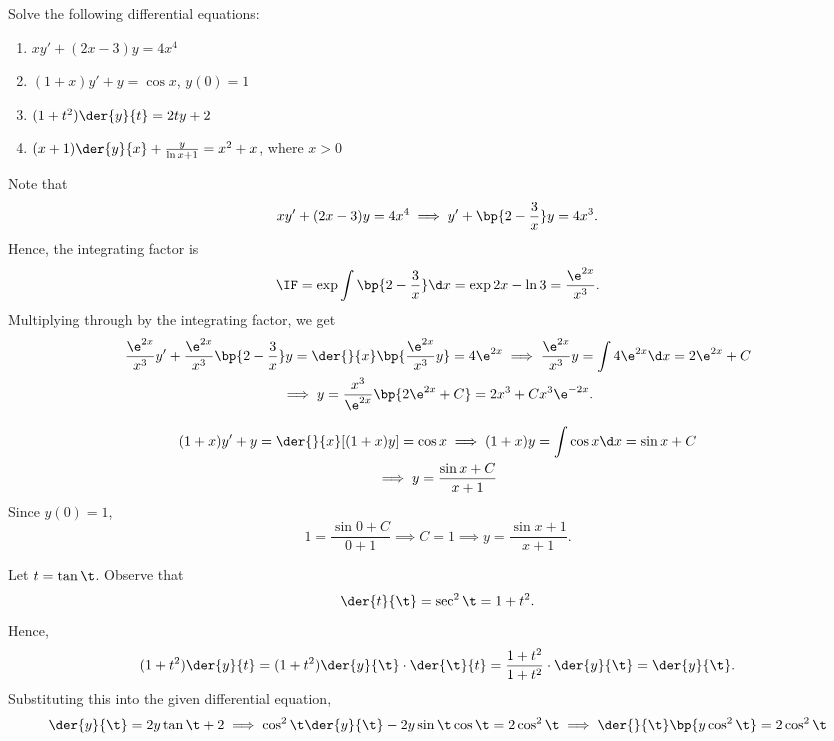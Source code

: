 \begin{problem}
    Solve the following differential equations:
    \begin{enumerate}
        \item $xy' + (2x-3)y = 4x^4$
        \item $(1+x)y' + y = \cos x$, $y(0) = 1$
        \item $(1 + t^2) \der{y}{t} = 2ty+2$
        \item $(x+1)\der{y}{x} + \frac{y}{\ln{x+1}} = x^2 + x$, where $x > 0$
    \end{enumerate}
\end{problem}
\clearpage
\begin{solution}
    \begin{ppart}
        Note that \[xy' + (2x-3)y = 4x^4 \implies y' + \bp{2 - \frac3x} y = 4x^3.\] Hence, the integrating factor is \[\IF = \exp \int \bp{2 - \frac3x} \d x = \exp{2x - \ln 3} = \frac{\e^{2x}}{x^3}.\] Multiplying through by the integrating factor, we get
        \begin{gather*}
            \frac{\e^{2x}}{x^3}y' + \frac{\e^{2x}}{x^3} \bp{2 - \frac3x} y = \der{}{x} \bp{\frac{\e^{2x}}{x^3} y} = 4\e^{2x} \implies \frac{\e^{2x}}{x^3} y = \int 4\e^{2x} \d x = 2\e^{2x} + C\\
            \implies y = \frac{x^3}{\e^{2x}} \bp{2\e^{2x} + C} = 2x^3 + Cx^3\e^{-2x}.
        \end{gather*}
    \end{ppart}
    \begin{ppart}
        \begin{gather*}
            (1+x)y' + y = \der{}{x} [(1+x)y] = \cos x \implies (1+x)y = \int \cos x \d x = \sin x + C\\
            \implies y = \frac{\sin x + C}{x+1}
        \end{gather*}
        Since $y(0) = 1$, \[1 = \frac{\sin 0 + C}{0+1} \implies C = 1 \implies y = \frac{\sin x + 1}{x + 1}.\]
    \end{ppart}
    \begin{ppart}
        Let $t = \tan \t$. Observe that \[\der{t}{\t} = \sec^2 \t = 1 + t^2.\] Hence, \[(1 + t^2) \der{y}{t} = (1 + t^2) \der{y}{\t} \cdot \der{\t}{t} = \frac{1 + t^2}{1 + t^2} \cdot \der{y}{\t} = \der{y}{\t}.\] Substituting this into the given differential equation,
        \begin{gather*}
            \der{y}{\t} = 2 y \tan \t + 2 \implies \cos^2 \t \der{y}{\t} - 2 y \sin \t \cos \t = 2\cos^2 \t \implies \der{}{\t} \bp{y\cos^2 \t} = 2\cos^2 \t\\

\end{gather*}
\end{ppart}
\end{solution}
